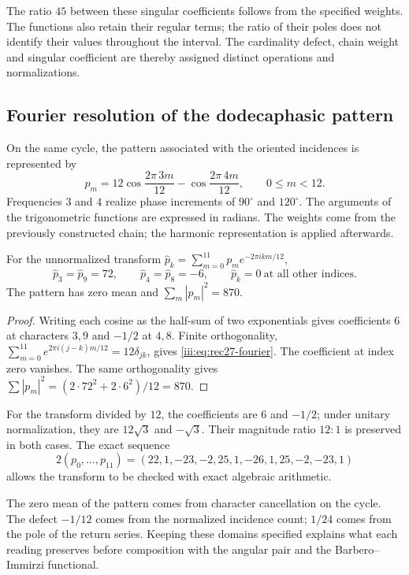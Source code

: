 The ratio $45$ between these singular coefficients follows from the
specified weights. The functions also retain their regular terms;
the ratio of their poles does not identify their values throughout the
interval. The cardinality defect, chain weight and singular coefficient
are thereby assigned distinct operations and normalizations.

\clearpage
\subsection{Fourier resolution of the dodecaphasic pattern}

On the same cycle, the pattern associated with the oriented incidences is
represented by
\begin{equation}
 p_m=12\cos\frac{2\pi\,3m}{12}
      -\cos\frac{2\pi\,4m}{12},\qquad 0\le m<12.
 \label{iii:eq:rec27-patron}
\end{equation}
Frequencies $3$ and $4$ realize phase increments of $90^\circ$ and
$120^\circ$. The arguments of the trigonometric functions are expressed
in radians. The weights come from the previously constructed chain;
the harmonic representation is applied afterwards.

\begin{proposition}
\label{iii:prop:rec27-fourier}
For the unnormalized transform
$\widehat p_k=\sum_{m=0}^{11}p_m e^{-2\pi i km/12}$,
\begin{equation}
 \widehat p_3=\widehat p_9=72,\qquad
 \widehat p_4=\widehat p_8=-6,
 \qquad \widehat p_k=0\ \text{at all other indices}.
 \label{iii:eq:rec27-fourier}
\end{equation}
The pattern has zero mean and $\sum_m|p_m|^2=870$.
\end{proposition}
\begin{proof}
Writing each cosine as the half-sum of two exponentials gives coefficients
$6$ at characters $3,9$ and $-1/2$ at $4,8$.
Finite orthogonality,
$\sum_{m=0}^{11}e^{2\pi i(j-k)m/12}=12\delta_{jk}$,
gives \eqref{iii:eq:rec27-fourier}. The coefficient at index zero
vanishes. The same orthogonality gives
$\sum|p_m|^2=(2\cdot72^2+2\cdot6^2)/12=870$.
\end{proof}

For the transform divided by $12$, the coefficients are $6$ and
$-1/2$; under unitary normalization, they are $12\sqrt3$ and $-\sqrt3$.
Their magnitude ratio $12:1$ is preserved in both cases. The exact sequence
\begin{equation}
 2(p_0,\ldots,p_{11})
 =(22,1,-23,-2,25,1,-26,1,25,-2,-23,1)
 \label{iii:eq:rec27-patron-racional}
\end{equation}
allows the transform to be checked with exact algebraic arithmetic.

The zero mean of the pattern comes from character cancellation on the
cycle. The defect $-1/12$ comes from the normalized incidence count;
$1/24$ comes from the pole of the return series. Keeping these domains
specified explains what each reading preserves before composition with
the angular pair and the Barbero--Immirzi functional.
